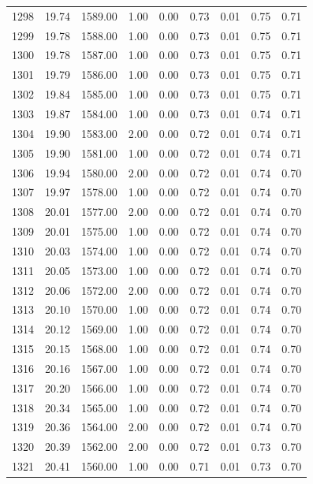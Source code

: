 \documentclass{article}\usepackage[]{graphicx}\usepackage[]{color}
\begin{document}
\begin{longtable}{rrrrrrrrr}
  1298 & 19.74 & 1589.00 & 1.00 & 0.00 & 0.73 & 0.01 & 0.75 & 0.71 \\ 
  1299 & 19.78 & 1588.00 & 1.00 & 0.00 & 0.73 & 0.01 & 0.75 & 0.71 \\ 
  1300 & 19.78 & 1587.00 & 1.00 & 0.00 & 0.73 & 0.01 & 0.75 & 0.71 \\ 
  1301 & 19.79 & 1586.00 & 1.00 & 0.00 & 0.73 & 0.01 & 0.75 & 0.71 \\ 
  1302 & 19.84 & 1585.00 & 1.00 & 0.00 & 0.73 & 0.01 & 0.75 & 0.71 \\ 
  1303 & 19.87 & 1584.00 & 1.00 & 0.00 & 0.73 & 0.01 & 0.74 & 0.71 \\ 
  1304 & 19.90 & 1583.00 & 2.00 & 0.00 & 0.72 & 0.01 & 0.74 & 0.71 \\ 
  1305 & 19.90 & 1581.00 & 1.00 & 0.00 & 0.72 & 0.01 & 0.74 & 0.71 \\ 
  1306 & 19.94 & 1580.00 & 2.00 & 0.00 & 0.72 & 0.01 & 0.74 & 0.70 \\ 
  1307 & 19.97 & 1578.00 & 1.00 & 0.00 & 0.72 & 0.01 & 0.74 & 0.70 \\ 
  1308 & 20.01 & 1577.00 & 2.00 & 0.00 & 0.72 & 0.01 & 0.74 & 0.70 \\ 
  1309 & 20.01 & 1575.00 & 1.00 & 0.00 & 0.72 & 0.01 & 0.74 & 0.70 \\ 
  1310 & 20.03 & 1574.00 & 1.00 & 0.00 & 0.72 & 0.01 & 0.74 & 0.70 \\ 
  1311 & 20.05 & 1573.00 & 1.00 & 0.00 & 0.72 & 0.01 & 0.74 & 0.70 \\ 
  1312 & 20.06 & 1572.00 & 2.00 & 0.00 & 0.72 & 0.01 & 0.74 & 0.70 \\ 
  1313 & 20.10 & 1570.00 & 1.00 & 0.00 & 0.72 & 0.01 & 0.74 & 0.70 \\ 
  1314 & 20.12 & 1569.00 & 1.00 & 0.00 & 0.72 & 0.01 & 0.74 & 0.70 \\ 
  1315 & 20.15 & 1568.00 & 1.00 & 0.00 & 0.72 & 0.01 & 0.74 & 0.70 \\ 
  1316 & 20.16 & 1567.00 & 1.00 & 0.00 & 0.72 & 0.01 & 0.74 & 0.70 \\ 
  1317 & 20.20 & 1566.00 & 1.00 & 0.00 & 0.72 & 0.01 & 0.74 & 0.70 \\ 
  1318 & 20.34 & 1565.00 & 1.00 & 0.00 & 0.72 & 0.01 & 0.74 & 0.70 \\ 
  1319 & 20.36 & 1564.00 & 2.00 & 0.00 & 0.72 & 0.01 & 0.74 & 0.70 \\ 
  1320 & 20.39 & 1562.00 & 2.00 & 0.00 & 0.72 & 0.01 & 0.73 & 0.70 \\ 
  1321 & 20.41 & 1560.00 & 1.00 & 0.00 & 0.71 & 0.01 & 0.73 & 0.70 \\ 

\end{longtable}
\end{document}
